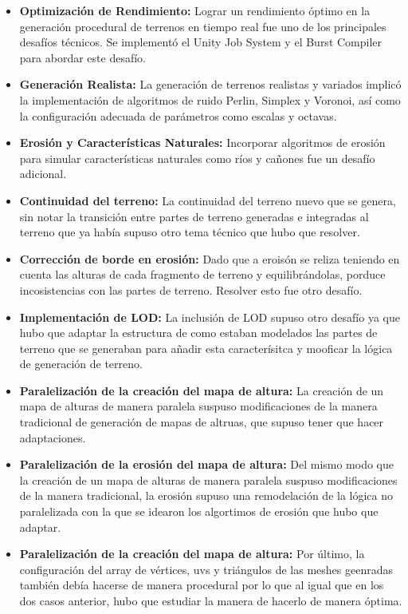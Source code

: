 \begin{itemize}
    \item \textbf{Optimización de Rendimiento:} Lograr un rendimiento óptimo en la generación procedural de terrenos en tiempo real fue uno de los principales desafíos técnicos. Se implementó el Unity Job System y el Burst Compiler para abordar este desafío.
    
    \item \textbf{Generación Realista:} La generación de terrenos realistas y variados implicó la implementación de algoritmos de ruido Perlin, Simplex y Voronoi, así como la configuración adecuada de parámetros como escalas y octavas.
    
    \item \textbf{Erosión y Características Naturales:} Incorporar algoritmos de erosión para simular características naturales como ríos y cañones fue un desafío adicional.
    
    \item \textbf{Continuidad del terreno:} La continuidad del terreno nuevo que se genera, sin notar la transición entre partes de terreno generadas e integradas al terreno que ya había supuso otro tema técnico que hubo que resolver.
    
    \item \textbf{Corrección de borde en erosión:} Dado que a eroisón se reliza teniendo en cuenta las alturas de cada fragmento de terreno y equilibrándolas, porduce incosistencias con las partes de terreno. Resolver esto fue otro desafío.
    
    \item \textbf{Implementación de LOD:}  La inclusión de LOD supuso otro desafío ya que hubo que adaptar la estructura de como estaban modelados las partes de terreno que se generaban para añadir esta caracterísitca y mooficar la lógica de generación de terreno.
    
    \item \textbf{Paralelización de la creación del mapa de altura:} La creación de un mapa de alturas de manera paralela suspuso modificaciones de la manera tradicional de generación de mapas de altruas, que supuso tener que hacer adaptaciones.
     
    \item \textbf{Paralelización de la erosión del mapa de altura:} Del mismo modo que la creación de un mapa de alturas de manera paralela suspuso modificaciones de la manera tradicional, la erosión supuso una remodelación de la lógica no paralelizada con la que se idearon los algortimos de erosión que hubo que adaptar.
     
    \item \textbf{Paralelización de la creación del mapa de altura:} Por último, la configuración del array de vértices, uvs y triángulos de las meshes geenradas también debía hacerse de manera procedural por lo que al igual que en los dos casos anterior, hubo que estudiar la manera de hacerlo de manera óptima.

\end{itemize}

